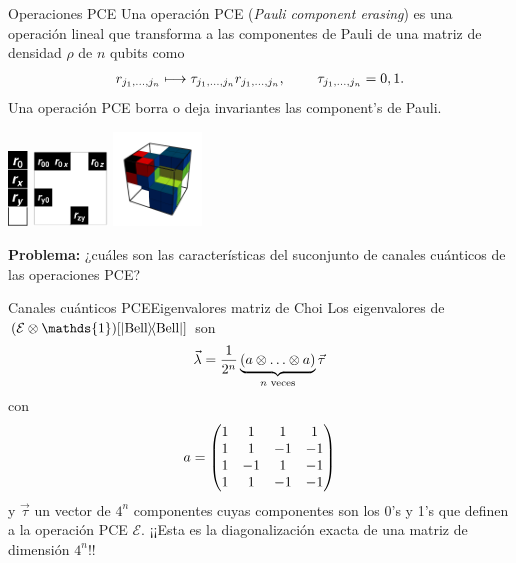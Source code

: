 \documentclass[xcolor=dvipsnames,presentation]{beamer}%
\begin{document}
\begin{frame}{Operaciones PCE}
	Una operación PCE (\textit{Pauli component erasing}) 
	es una operación lineal que transforma a las 	componentes 
	de Pauli de una matriz de densidad $\rho$ de $n$ qubits como
	\begin{align*}
	r_{j_1,\ldots,j_n}\longmapsto \tau_{j_1,\ldots,j_n}r_{j_1,\ldots,j_n},
	\hspace{.8cm}\tau_{j_1,\ldots,j_n}=0,1.
	\end{align*}
	\alert{Una operación PCE borra o deja invariantes las component's de Pauli. }
	
	\hfill
	\includegraphics[height=2cm]{1qubit_pce_01}
	\hspace{1.8cm}
	\includegraphics[height=2cm]{2qubit_pce_01}
	\hfill
	\includegraphics[height=2.5cm]{3qubit_pce_01}
	\hspace{1cm} 

	\vfill	
	
	\textbf{Problema:} ¿cuáles son las características del suconjunto 
	de canales cuánticos de las operaciones PCE?
\end{frame}


\begin{frame}{Canales cuánticos PCE}{Eigenvalores matriz de Choi} 
Los eigenvalores de $\qty(\mathcal{E}\otimes
\mathds{1})\qty[\dyad{\text{Bell}}{\text{Bell}}]$ son
\begin{align*}
\vec{\lambda} = \frac{1}{2^n}
\underbrace{\qty(a\otimes \ldots\otimes a)}_{n\text{ veces}} \vec{\tau}
\end{align*}
con
\begin{align*}
a=\mqty(1&1&1&1\\1&1&-1&-1\\1&-1&1&-1\\1&1&-1&-1)
\end{align*}
y $\vec{\tau}$ un vector de $4^n$ componentes cuyas 
componentes son los 0's y 1's que definen a la operación PCE $\mathcal{E}$.
\alert{¡¡Esta es la diagonalización exacta de una matriz de dimensión $4^n$!!}
\end{frame}
\end{document}
